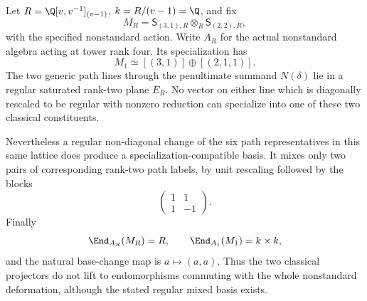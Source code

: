 \begin{finding}\label{f:tower}
Let $R=\Q[v,v^{-1}]_{(v-1)}$, $k=R/(v-1)=\Q$, and fix
\[
 M_R=\mathsf S_{(3,1),R}\otimes_R\mathsf S_{(2,2),R},
\]
with the specified nonstandard action. Write $A_R$ for the actual
nonstandard algebra acting at tower rank four. Its specialization has
\[
 M_1\simeq[(3,1)]\oplus[(2,1,1)].
\]
The two generic path lines through the penultimate summand $N(\delta)$
lie in a regular saturated rank-two plane $E_R$. No vector on either
line which is diagonally rescaled to be regular with nonzero reduction
can specialize into one of these two classical constituents.

Nevertheless a regular non-diagonal change of the six path representatives
in this same lattice does produce a specialization-compatible basis.
It mixes only two pairs of corresponding rank-two path labels, by
unit rescaling followed by the blocks
\[
 \begin{pmatrix}1&1\\1&-1\end{pmatrix}.
\]
Finally
\[
 \End_{A_R}(M_R)=R,\qquad \End_{A_1}(M_1)=k\times k,
\]
and the natural base-change map is $a\mapsto(a,a)$. Thus the two
classical projectors do not lift to endomorphisms commuting with the
whole nonstandard deformation, although the stated regular mixed basis
exists.
\end{finding}
